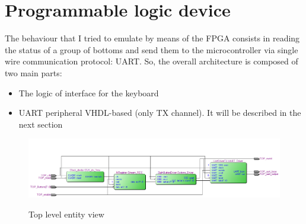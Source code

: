 \section{Programmable logic device}

The behaviour that I tried to emulate by means of the FPGA consists in reading the status of a group of bottoms and send them to the microcontroller via single wire communication protocol: UART. So, the overall architecture is composed of two main parts:
\begin{itemize}
\item The logic of interface for the keyboard
\item UART peripheral VHDL-based (only TX channel). It will be described in the next section
\end{itemize}

\begin{figure}[H]
\centering
\includegraphics[scale=.5]{Immagini/15}
\label{15}
\caption{Top level entity view}
\end{figure}

